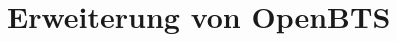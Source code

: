 \documentclass[a4paper,11pt,oneside]{article}
\begin{document}
\raggedbottom

  



\section{Erweiterung von OpenBTS}










\printindex
\end{document}
